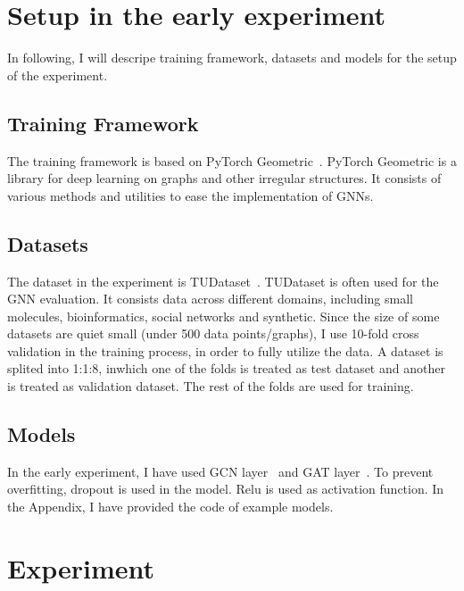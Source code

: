 \documentclass{article}
\begin{document}
\section{Setup in the early experiment}
In following, I will descripe training framework, datasets and models for the setup of the experiment.

\subsection{Training Framework}
The training framework is based on PyTorch Geometric~\cite{fey2019fast}. PyTorch Geometric is a library for deep learning on graphs and other irregular structures. It consists of various methods and utilities to ease the implementation of GNNs.

\subsection{Datasets}
The dataset in the experiment is TUDataset~\cite{morris_tudataset_2020}. TUDataset is often used for the GNN evaluation. It consists data across different domains, including small molecules, bioinformatics, social networks and synthetic. Since the size of some datasets are quiet small (under 500 data points/graphs), I use 10-fold cross validation in the training process, in order to fully utilize the data. A dataset is splited into 1:1:8, inwhich one of the folds is treated as test dataset and another is treated as validation dataset. The rest of the folds are used for training. 

\subsection{Models}
In the early experiment, I have used GCN layer~\cite{kipf2017semisupervised} and GAT layer~\cite{velickovic2020pointer}. To prevent overfitting, dropout is used in the model. Relu is used as activation function. In the Appendix, I have provided the code of example models.


\section{Experiment}
\end{document}
